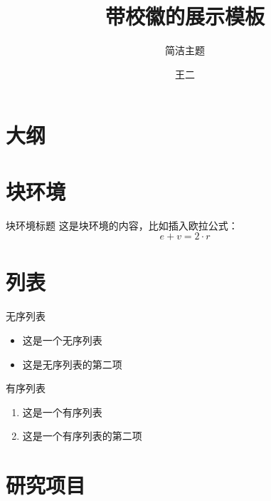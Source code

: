 \documentclass[utf8]{beamer}
\title{带校徽的展示模板}
\subtitle{简洁主题}
\author{王二}
\institute{\href{mailto:Feb14@163.com}{\Letter Feb14\MVAt163.com}\\\vspace{1ex}人文与社会科学学院}
\begin{document}
\begin{frame}
	\titlepage
	\thispagestyle{empty}
\end{frame}
\section{大纲}
\begin{frame}
\tableofcontents
\end{frame}
\section{块环境}
\begin{frame}
	\begin{block}{块环境标题}
		这是块环境的内容，比如插入欧拉公式：
		\begin{equation}
			e+v=2\cdot r
		\end{equation}
	\end{block}
\end{frame}
\section{列表}
\begin{frame}
	\begin{block}{无序列表}
	\begin{itemize}
		\item 这是一个无序列表
		\item 这是无序列表的第二项
	\end{itemize}
	\end{block}
	\begin{block}{有序列表}
		\begin{enumerate}	
		\item 这是一个有序列表
		\item 这是一个有序列表的第二项
	\end{enumerate}
	\end{block}
\end{frame}
\section{研究项目}
\end{document}
